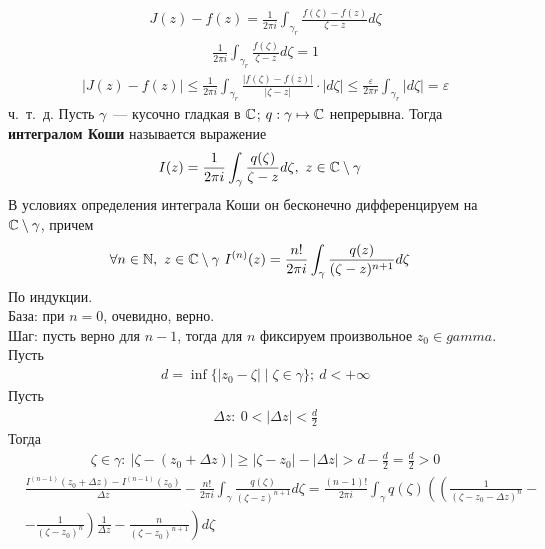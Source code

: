 \begin{align*}
  & J(z) - f(z) = \frac{1}{2 \pi i} \int_{\gamma_r} \frac{f(\zeta) - f(z)}{\zeta - z} d \zeta
\end{align*}
\begin{align*}
  & \frac{1}{2 \pi i} \int_{\gamma_r} \frac{f(\zeta)}{\zeta - z} d \zeta = 1
\end{align*}
\begin{align*}
  & \left| J(z) - f(z) \right| \leq \frac{1}{2 \pi i} \int_{\gamma_r} \frac{\left| f(\zeta) - f(z) \right|}{\left| \zeta - z \right|} \cdot \left| d\zeta \right| \leq \frac{\varepsilon}{2 \pi r} \int_{\gamma_r}\left| d\zeta \right| = \varepsilon
\end{align*}
ч.~т.~д.
\Def
Пусть $\gamma$~--- кусочно гладкая в $\mathbb{C}$; $q: \gamma \mapsto \mathbb{C}$ непрерывна.
Тогда \textbf{интегралом Коши} называется выражение
\begin{equation} \label{(8.2)}
    I(z) = \frac{1}{2 \pi i} \int_{\gamma} \frac{q(\zeta)}{\zeta - z} d\zeta, \ z \in \mathbb{C} \setminus \gamma
\end{equation}
\theorem
В условиях определения интеграла Коши он бесконечно дифференцируем на
$\mathbb{C}\setminus\gamma$, причем
\begin{equation} \label{(8.3)}
    \forall n \in \mathbb{N}, \  z \in \mathbb{C} \setminus \gamma \ I^{(n)}(z) = \frac{n!}{2 \pi i} \int_{\gamma} \frac{q(z)}{(\zeta - z)^{n+1}} d\zeta
\end{equation}
\pr
По индукции.
\\
База: при $n=0$, очевидно, верно.
\\
Шаг: пусть верно для $n-1$, тогда для $n$ фиксируем произвольное $z_0 \in
gamma$.
\\
Пусть
\begin{align*}
  & d = \inf\{\left| z_0 - \zeta \right| \mid \zeta \in \gamma\}; \ d < +\infty
\end{align*}
Пусть
\begin{align*}
  & \Delta z: \ 0 < \left| \Delta z \right| < \frac{d}{2}
\end{align*}
Тогда
\begin{align*}
  & \zeta \in \gamma: \ \left| \zeta - (z_0+\Delta z)\right| \geq \left| \zeta - z_0 \right| - \left| \Delta z \right| > d - \frac{d}{2} = \frac{d}{2} > 0
\end{align*}
\begin{align*}
  & \frac{I^{(n-1)}(z_0+\Delta z) - I^{(n-1)}(z_0)}{\Delta z} - \frac{n!}{2 \pi i}\int_{\gamma}\frac{q(\zeta)}{(\zeta-z)^{n+1}}d\zeta = \frac{(n-1)!}{2 \pi i}\int_{\gamma}q(\zeta)\left( \left( \frac{1}{(\zeta-z_0-\Delta z)^n} - \right. \right.\\
  & \left. \left. - \frac{1}{(\zeta-z_0)^n} \right)\frac{1}{\Delta z} - \frac{n}{(\zeta-z_0)^{n+1}}\right)d\zeta
\end{align*}
